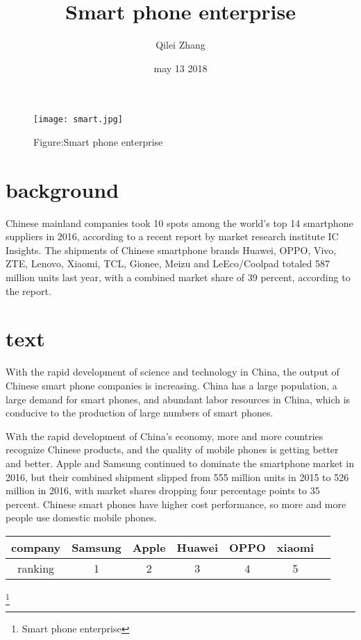 \documentclass[10pt]{article}
\begin{document}
\title{Smart phone enterprise}
\author{Qilei Zhang}
\date{may 13 2018}
\maketitle
\par
\begin{figure}[htbp]
\small
\centering
\texttt{[image: smart.jpg]}
\caption{Figure:Smart phone enterprise}
\label{fig:lable}
\end{figure}
\par
\section{background}
Chinese mainland companies took 10 spots among the world's top 14 smartphone suppliers in 2016, according to a recent report by market research institute IC Insights. The shipments of Chinese smartphone brands Huawei, OPPO, Vivo, ZTE, Lenovo, Xiaomi, TCL, Gionee, Meizu and LeEco/Coolpad totaled 587 million units last year, with a combined market share of 39 percent, according to the report.\cite{higham1994bibtex}
\par
\section{text}
With the rapid development of science and technology in China, the output of Chinese smart phone companies is increasing. China has a large population, a large demand for smart phones, and abundant labor resources in China, which is conducive to the production of large numbers of smart phones.\cite{haaa2015bibtex}
\par
With the rapid development of China's economy, more and more countries recognize Chinese products, and the quality of mobile phones is getting better and better. Apple and Samsung continued to dominate the smartphone market in 2016, but their combined shipment slipped from 555 million units in 2015 to 526 million in 2016, with market shares dropping four percentage points to 35 percent. Chinese smart phones have higher cost performance, so more and more people use domestic mobile phones.\\
\par
\begin{tabular}{|c|c|c|c|c|c|p{20em}}
\hline
company  & Samsung & Apple & Huawei&OPPO&xiaomi\\
\hline
ranking  &   1     &  2    &   3   & 4  &  5\\
\hline
\end{tabular}
\footnote{\centering Smart phone enterprise}
\end{document}
